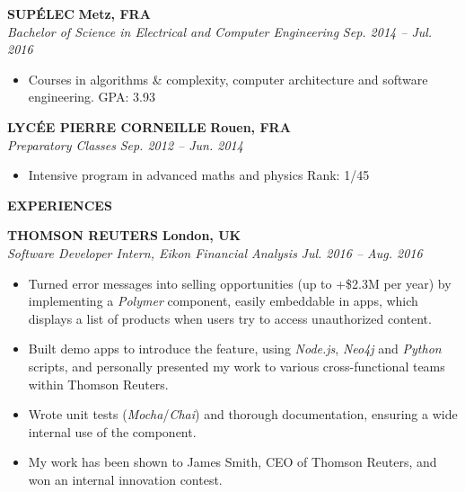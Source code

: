 \documentclass[a4paper, 12pt]{article}
\newcommand{\marginline}{-0.3cm}
\newcommand{\margincontent}{-0.6cm}
\newcommand{\linewidthperso}{0.02cm}
\begin{document}
\begin{footnotesize}
\textbf{SUP\'ELEC} \hfill \textbf{Metz, FRA}\\
\textit{Bachelor of Science in Electrical and Computer Engineering} \hfill \textit{Sep. 2014 -- Jul. 2016}\\
\vspace{\margincontent}
\begin{itemize}
  \item Courses in algorithms \& complexity, computer architecture and software engineering. \hfill GPA: 3.93
\end{itemize}

\textbf{LYC\'EE PIERRE CORNEILLE} \hfill \textbf{Rouen, FRA}\\
\textit{Preparatory Classes} \hfill \textit{Sep. 2012 -- Jun. 2014}\\
\vspace{\margincontent}
\begin{itemize}
  \item Intensive program in advanced maths and physics \hfill Rank: 1/45
\end{itemize}

\textbf{EXPERIENCES}
\vspace{\marginline}\\
\noindent\makebox[\linewidth]{\rule{\textwidth}{\linewidthperso}}

\textbf{THOMSON REUTERS} \hfill \textbf{London, UK}\\ 
\textit{Software Developer Intern, Eikon Financial Analysis} \hfill \textit{Jul. 2016 -- Aug. 2016}\\
\vspace{\margincontent}
\begin{itemize}
  \item Turned error messages into selling opportunities (up to +\$2.3M per year) by implementing a \textit{Polymer} component, easily embeddable in apps, which displays a list of products when users try to access unauthorized content.
  \item Built demo apps to introduce the feature, using \textit{Node.js}, \textit{Neo4j} and \textit{Python} scripts, and personally presented my work to various cross-functional teams within Thomson Reuters.
  \item Wrote unit tests (\textit{Mocha}/\textit{Chai}) and thorough documentation, ensuring a wide internal use of the component.
  \item My work has been shown to James Smith, CEO of Thomson Reuters, and won an internal innovation contest.
\end{itemize}


\end{footnotesize}
\end{document}
